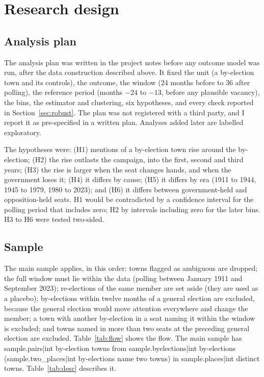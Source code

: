 \documentclass[11pt,a4paper]{article}
\begin{document}
\section{Research design}\label{sec:design}
\subsection{Analysis plan}
The analysis plan was written in the project notes before any outcome model was run, after the data construction described above. It fixed the unit (a by-election town and its controls), the outcome, the window (24 months before to 36 after polling), the reference period (months $-24$ to $-13$, before any plausible vacancy), the bins, the estimator and clustering, six hypotheses, and every check reported in Section~\ref{sec:robust}. The plan was not registered with a third party, and I report it as pre-specified in a written plan. Analyses added later are labelled exploratory.

The hypotheses were: (H1) mentions of a by-election town rise around the by-election; (H2) the rise outlasts the campaign, into the first, second and third years; (H3) the rise is larger when the seat changes hands, and when the government loses it; (H4) it differs by cause; (H5) it differs by era (1911 to 1944, 1945 to 1979, 1980 to 2023); and (H6) it differs between government-held and opposition-held seats. H1 would be contradicted by a confidence interval for the polling period that includes zero; H2 by intervals including zero for the later bins. H3 to H6 were tested two-sided.

\subsection{Sample}
The main sample applies, in this order: towns flagged as ambiguous are dropped; the full window must lie within the data (polling between January 1911 and September 2023); re-elections of the same member are set aside (they are used as a placebo); by-elections within twelve months of a general election are excluded, because the general election would move attention everywhere and change the member; a town with another by-election in a seat naming it within the window is excluded; and towns named in more than two seats at the preceding general election are excluded. Table~\ref{tab:flow} shows the flow. The main sample has {{sample.pairs|int}} by-election towns from {{sample.byelections|int}} by-elections ({{sample.two_places|int}} by-elections name two towns) in {{sample.places|int}} distinct towns. Table~\ref{tab:desc} describes it.
\end{document}

